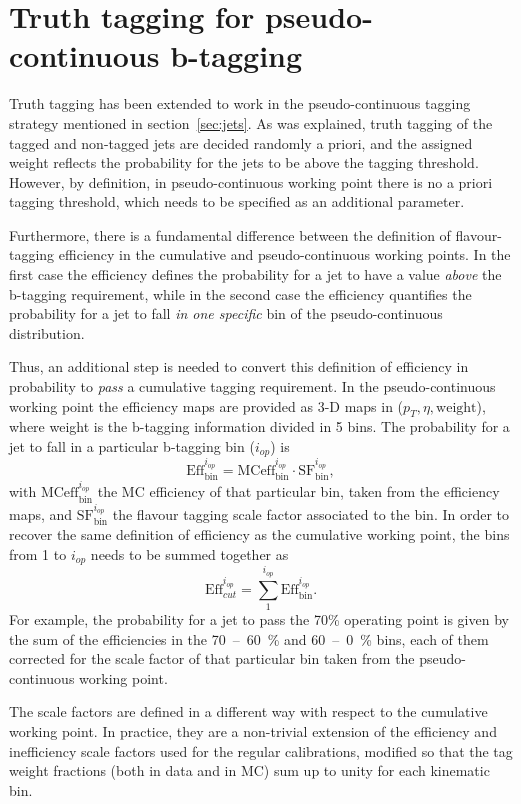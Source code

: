 \chapter{Truth tagging for pseudo-continuous b-tagging}
\label{app:truth-tag-pcbt}
Truth tagging has been extended to work in the pseudo-continuous tagging
strategy mentioned in section~\ref{sec:jets}. As was explained, truth tagging of
the tagged and non-tagged jets are decided randomly a priori, and the assigned
weight reflects the probability for the jets to be above the tagging threshold.
However, by definition, in pseudo-continuous working point there is no a priori
tagging threshold, which needs to be specified as an additional parameter.

Furthermore, there is a fundamental difference between the definition of
flavour-tagging efficiency in the cumulative and pseudo-continuous working
points. In the first case the efficiency defines the probability for a jet to
have a value \textit{above} the b-tagging requirement, while in the second case
the efficiency quantifies the probability for a jet to fall \textit{in one
  specific} bin of the pseudo-continuous distribution.

 Thus, an additional step is needed to convert this definition of efficiency in
 probability to \textit{pass} a cumulative tagging requirement.  In the
 pseudo-continuous working point the efficiency maps are provided as 3-D maps in
 ($p_T, \eta, \text{weight}$), where weight is the b-tagging information divided
 in 5 bins. The probability for a jet to fall in a particular b-tagging
 bin ($i_{op}$) is
 \begin{equation}
   \text{Eff}_{\text{bin}}^{i_{op}} = \text{MCeff}_{\text{bin}}^{i_{op}} \cdot \text{SF}_{\text{bin}}^{i_{op}},
 \end{equation}
 with $\text{MCeff}_{\text{bin}}^{i_{op}}$ the MC efficiency of that particular
 bin, taken from the efficiency maps, and $\text{SF}_{\text{bin}}^{i_{op}}$ the
 flavour tagging scale factor associated to the bin. In order to recover the
 same definition of efficiency as the cumulative working point, the bins from 1
 to $i_{op}$ needs to be summed together as
 \begin{equation}
   \text{Eff}_{cut}^{i_{op}} = \sum_1^{i_{op}} \text{Eff}_{\text{bin}}^{i_{op}}.
 \end{equation}
 For example, the probability for a jet to pass the 70\% operating point is
 given by the sum of the efficiencies in the 70~--~60~\% and 60~--~0~\% bins,
 each of them corrected for the scale factor of that particular bin taken from
 the pseudo-continuous working point.
 
 The scale factors are defined in a different way with respect to the cumulative
 working point. In practice, they are a non-trivial extension of the efficiency
 and inefficiency scale factors used for the regular calibrations, modified so
 that the tag weight fractions (both in data and in MC) sum up to unity for each
 kinematic bin.